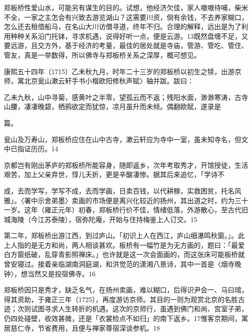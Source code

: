 郑板桥性爱山水，可能另有谋生的目的。试想，他经济欠佳，家人嗷嗷待哺，柴米不全，一家之主怎会有兴致去游览湖山？这需要川资，倘有余钱，不去养家糊口，怎么还去租借船马，在名山大川访僧寻道，终年不归。合理的解释，远出是为了利用种种关系沿门托钵，寻求机遇，说得好听一点，便是云游。13既然盘缠不足，又要远游，且交方外，基于经济的考量，最佳的居处就是寺庙，管游、管吃、管住、管友，真是一举数得，所以佛寺与郑板桥关系之深厚，概可想见。

康熙五十四年（1715）乙未秋九月，时年二十三岁的郑板桥以初生之犊，出游京师，寓北京瓮山漱云轩手书小楷欧阳修秋声赋〉轴并跋。跋曰：

\begin{BookQuote}
乙未九秋，山中寻菊，感黄叶之半零，望孤云而不返；残阳水面，渺渺寒涛，古寺山腰，凄凄晚碧，栖鸦欲定而犹惊，凉月虽升而未倾。偶翻欧赋，遂录是
\end{BookQuote}

篇。

瓮山及万寿山，郑板桥应住在山中古寺，漱云轩应为寺中一室，虽未知寺名，但文中已指证历历。14

京都岂有刚出茅庐的郑板桥所能容身，随即返乡，次年考取秀才，开馆授徒，生活艰苦，加上父亲弃世，惇儿夭折，更是辛酸凄惨。据其后来追忆，「学诗不

\vfill
\begin{BookNotes}
\end{BookNotes}

\noindent 成，去而学写，学写不成，去而学画，日卖百钱，以代耕稼，实救困贫，托名风雅」。〈署中示舍弟墨〉卖画的市场便是离兴化较近的扬州，其出道之时，约为三十一岁。这年（雍正元年）初春，郑板桥行价不佳，情绪低落，外游散心，至古代旧城海陵（今江苏泰陵），宿弥陀庵，开始与住持梅鉴上人订交。15

第二年，郑板桥出游江西，到过庐山。「初识上人在西江，庐山细瀑鸣秋窗。」。此上人指的是无方和尚，两人相谈甚欢。板桥有一幅竹是为无方画的，题曰：「最爱白方窗纸破，乱穿青影照禅床。」也许就是这一次会面画的，而这张床可能板桥就曾安寝过。接着亲临湖南洞庭湖，和洪觉范的潇湘八景诗，其中一首是〈烟寺晚钟〉，想当然又是投宿佛寺。16

郑板桥因只是秀才，缺乏名气，在扬州卖画，难以糊口，后得识尹会一、马曰琯，得其资助，于雍正三年（1725），再度游访京师。其目的一则为观赏北京的名胜古迹；次则试图寻求人生转折的机遇。这次的京师行，虽遇到佛门和尚、宫室子弟，仍四处碰壁，收效甚微，还是「衣裳检点不如归」的南下返乡。17惟客京期间，寓居慈仁寺，节省费用，且便与禅家尊宿深谈参机。18

